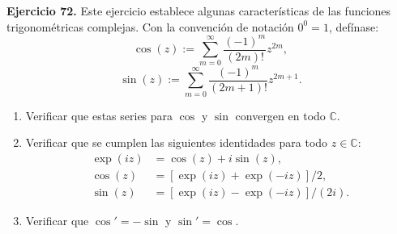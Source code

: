 \documentclass[11pt,a4paper]{article}
\theoremstyle{definition}
\theoremstyle{plain}
\theoremstyle{remark}
\begin{document}
	\noindent \textbf{Ejercicio 72.} Este ejercicio establece algunas características de las funciones trigonométricas complejas. Con la convención de notación $0^0 = 1$, defínase:
	$$\cos(z) := \sum_{m=0}^\infty \frac{(-1)^m}{(2m)!} z^{2m},$$$$\sin(z) := \sum_{m=0}^\infty \frac{(-1)^m}{(2m+1)!} z^{2m+1}.$$\begin{enumerate}
		\item[(72.1)] Verificar que estas series para $\cos$ y $\sin$ convergen en todo $\mathbb{C}$.
		\item[(72.2)] Verificar que se cumplen las siguientes identidades para todo $z \in \mathbb{C}$:
		$$\begin{aligned} \exp(iz) &= \cos(z) + i \sin(z), \\ \cos(z) &= [\exp(iz) + \exp(-iz)]/2, \\ \sin(z) &= [\exp(iz) - \exp(-iz)]/(2i). \end{aligned}$$
		\item[(72.3)] Verificar que $\cos' = -\sin$ y $\sin' = \cos$.

\end{enumerate}
\end{document}
